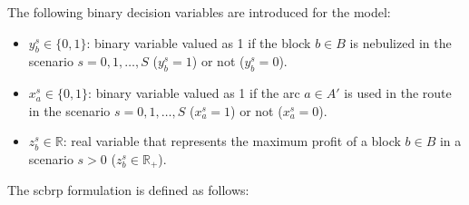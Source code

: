 The following binary decision variables are introduced for the model:

\begin{itemize}
	\item $y_{b}^{s} \in \{0, 1\}$: binary variable valued as 1 if the block $b \in B$ is nebulized in the scenario $s = {0, 1, \dots, S}$ ($y_{b}^{s} = 1$) or not ($y_{b}^{s} = 0$).
	\item $x_{a}^{s} \in \{0, 1\}$: binary variable valued as 1 if the arc $a \in A'$ is used in the route in the scenario $s = {0, 1, \dots, S}$ ($x_{a}^{s} = 1$) or not ($x_{a}^{s} = 0$).
	\item $z_{b}^{s} \in \mathbb{R}$: real variable that represents the maximum profit of a block $b \in B$ in a scenario $s > 0$ ($z_{b}^{s} \in \mathbb{R}_{+}$).
\end{itemize}

The \gls{scbrp} formulation is defined as follows:

